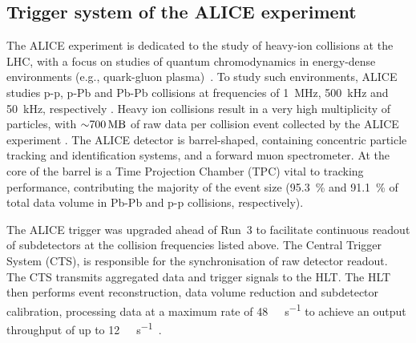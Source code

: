 \subsection{Trigger system of the ALICE experiment}
The ALICE experiment is dedicated to the study of heavy-ion collisions at the LHC, with a focus on studies of quantum chromodynamics in energy-dense environments (e.g.,  quark-gluon plasma)~\cite{alice-performance-paper-run1}. To study such environments, ALICE studies p-p, p-Pb and Pb-Pb collisions at frequencies of \SI{1}{\mega\hertz}, \SI{500}{\kilo\hertz} and \SI{50}{\kilo\hertz}, respectively \cite{alice-trigger-run3}. Heavy ion collisions result in a very high multiplicity of particles, with ${\sim}\SI{700}{\mega\byte}$ of raw data per collision event collected by the ALICE experiment \cite{alice-rta-trigger}. The ALICE detector is barrel-shaped, containing concentric particle tracking and identification systems, and a forward muon spectrometer. At the core of the barrel is a Time Projection Chamber (TPC) vital to tracking performance, contributing the majority of the event size (\SI{95.3}{\percent} and \SI{91.1}{\percent} of total data volume in Pb-Pb and p-p collisions, respectively).

The ALICE trigger was upgraded ahead of Run~3 to facilitate continuous readout of subdetectors at the collision frequencies listed above. The Central Trigger System (CTS), is responsible for the synchronisation of raw detector readout. The CTS transmits aggregated data and trigger signals to the HLT. The HLT then performs event reconstruction, data volume reduction and subdetector calibration, processing data at a maximum rate of \SI{48}{\giga\byte\per\second} to achieve an output throughput of up to \SI{12}{\giga\byte\per\second}~\cite{alice-rta-trigger}.
